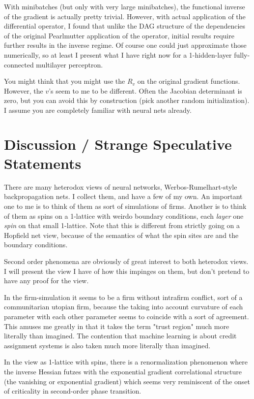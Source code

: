 \documentclass{article}
\begin{document}
With minibatches (but only with very large minibatches), the functional inverse of the gradient is actually pretty trivial. However, with actual application of the differential operator, I found that unlike the DAG structure of the dependencies of the original Pearlmutter application of the operator, initial results require further results in the inverse regime. Of course one could just approximate those numerically, so at least I present what I have right now for a 1-hidden-layer fully-connected multilayer perceptron.

You might think that you might use the $R_v$ on the original gradient functions. However, the $v$'s seem to me to be different. Often the Jacobian determinant is zero, but you can avoid this by construction (pick another random initialization). I assume you are completely familiar with neural nets already\cite{deeplearning}.


\section{Discussion / Strange Speculative Statements}

There are many heterodox views of neural networks, Werbos-Rumelhart-style backpropagation nets. I collect them, and have a few of my own. An important one to me is to think of them as sort of simulations of firms. Another is to think of them as spins on a 1-lattice with weirdo boundary conditions, each \textit{layer} one \textit{spin} on that small 1-lattice. Note that this is different from strictly going on a Hopfield net view, because of the semantics of what the spin sites are and the boundary conditions.

Second order phenomena are obviously of great interest to both heterodox views. I will present the view I have of how this impinges on them, but don't pretend to have any proof for the view.

In the firm-simulation it seems to be a firm without intrafirm conflict, sort of a communitarian utopian firm, because the taking into account curvature of each parameter with each other parameter seems to coincide with a sort of agreement. This amuses me greatly in that it takes the term "trust region" much more literally than imagined. The contention that machine learning is about credit assignment systems is also taken much more literally than imagined.

In the view as 1-lattice with spins, there is a renormalization phenomenon where the inverse Hessian futzes with the exponential gradient correlational structure (the vanishing or exponential gradient) which seems very reminiscent of the onset of criticality in second-order phase transition.
\end{document}
